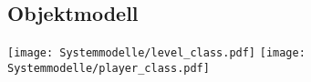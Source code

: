 \subsection{Objektmodell}
\clearpage
\texttt{[image: Systemmodelle/level\_class.pdf]}
\clearpage
\texttt{[image: Systemmodelle/player\_class.pdf]}
